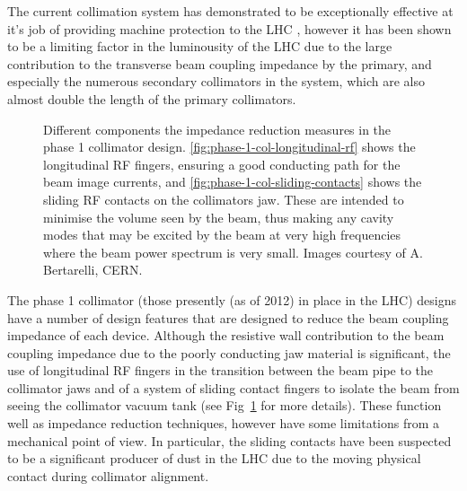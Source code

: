 The current collimation system has demonstrated to be exceptionally effective at it's job of providing machine protection to the LHC \cite{Zerlauth:MP}, however it has been shown to be a limiting factor in the luminousity of the LHC due to the large contribution to the transverse beam coupling impedance by the primary, and especially the numerous secondary collimators in the system, which are also almost double the length of the primary collimators. 

\begin{figure}
\label{fig:phase-1-rf}
\caption{Different components the impedance reduction measures in the phase 1 collimator design. \ref{fig:phase-1-col-longitudinal-rf} shows the longitudinal RF fingers, ensuring a good conducting path for the beam image currents, and \ref{fig:phase-1-col-sliding-contacts} shows the sliding RF contacts on the collimators jaw. These are intended to minimise the volume seen by the beam, thus making any cavity modes that may be excited by the beam at very high frequencies where the beam power spectrum is very small. Images courtesy of A. Bertarelli, CERN.}
\end{figure}

The phase 1 collimator (those presently (as of 2012) in place in the LHC) designs have a number of design features that are designed to reduce the beam coupling impedance of each device. Although the resistive wall contribution to the beam coupling impedance due to the poorly conducting jaw material is significant, the use of longitudinal RF fingers in the transition between the beam pipe to the collimator jaws and of a system of sliding contact fingers to isolate the beam from seeing the collimator vacuum tank (see Fig~\ref{fig:phase-1-rf} for more details). These function well as impedance reduction techniques, however have some limitations from a mechanical point of view. In particular, the sliding contacts have been suspected to be a significant producer of dust in the LHC due to the moving physical contact during collimator alignment. 

